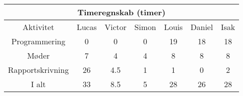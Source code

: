 \centering
\begin{tabular}{ |c|c|c|c|c|c|c|  }
 \hline
 \multicolumn{7}{|c|}{Timeregnskab (timer)} \\
 \hline
 Aktivitet & Lucas & Victor & Simon & Louis & Daniel & Isak\\
 \hline
 
 
 Programmering      & 0 & 0 & 0 & 19 & 18 & 18 \\
 
 Møder              & 7 & 4 & 4 & 8 & 8 & 8 \\
 
 Rapportskrivning   & 26 & 4.5 & 1 & 1& 0 & 2 \\
 
 \hline
 
 I alt              & 33 & 8.5 & 5 & 28 & 26 & 28 \\
 
 
 \hline
\end{tabular}